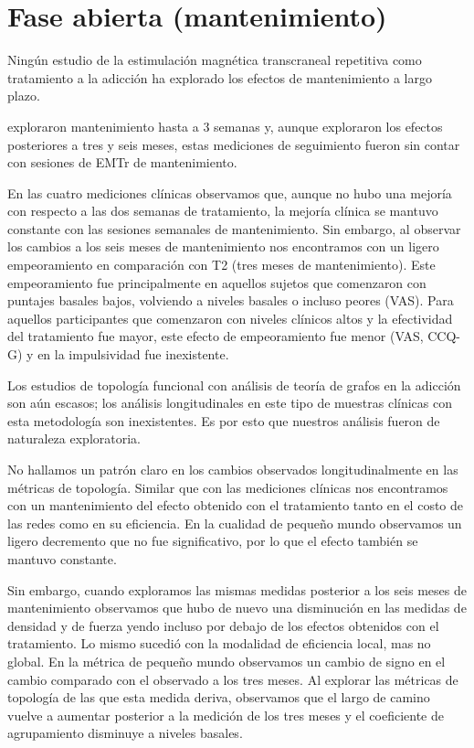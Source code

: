 \section{Fase abierta (mantenimiento)}
Ningún estudio de la estimulación magnética transcraneal repetitiva como tratamiento a la adicción ha explorado los efectos de mantenimiento a largo plazo.\par
\textcite{Terraneo2016} exploraron mantenimiento hasta a 3 semanas y, aunque \textcite{Bolloni2016} exploraron los efectos posteriores a tres y seis meses, estas mediciones de seguimiento  fueron sin contar con sesiones de EMTr de mantenimiento.\par
En las cuatro mediciones clínicas observamos que, aunque no hubo una mejoría con respecto a las dos semanas de tratamiento, la mejoría clínica se mantuvo constante con las sesiones semanales de mantenimiento.
Sin embargo, al observar los cambios a los seis meses de mantenimiento nos encontramos con un ligero empeoramiento en comparación con T2 (tres meses de mantenimiento). Este empeoramiento fue principalmente en aquellos sujetos que comenzaron con puntajes basales bajos, volviendo a niveles basales o incluso peores (VAS). Para aquellos participantes que comenzaron con niveles clínicos altos y la efectividad del tratamiento fue mayor, este efecto de empeoramiento fue menor (VAS, CCQ-G) y en la impulsividad fue inexistente.

Los estudios de topología funcional con análisis de teoría de grafos en la adicción son aún escasos; los análisis longitudinales en este tipo de muestras clínicas con esta metodología son inexistentes. Es por esto que nuestros análisis fueron de naturaleza exploratoria.\par
No hallamos un patrón claro en los cambios observados longitudinalmente en las métricas de topología. Similar que con las mediciones clínicas nos encontramos con un mantenimiento del efecto obtenido con el tratamiento tanto en el costo de las redes como en su eficiencia. En la cualidad de pequeño mundo observamos un ligero decremento que no fue significativo, por lo que el efecto también se mantuvo constante. \par
Sin embargo, cuando exploramos las mismas medidas posterior a los seis meses de mantenimiento observamos que hubo de nuevo una disminución en las medidas de densidad y de fuerza yendo incluso por debajo de los efectos obtenidos con el tratamiento. Lo mismo sucedió con la modalidad de eficiencia local, mas no global. En la métrica de pequeño mundo observamos un cambio de signo en el cambio comparado con el observado a los tres meses. Al explorar las métricas de topología de las que esta medida deriva, observamos que el largo de camino vuelve a aumentar posterior a la medición de los tres meses y el coeficiente de agrupamiento disminuye a niveles basales. \par

